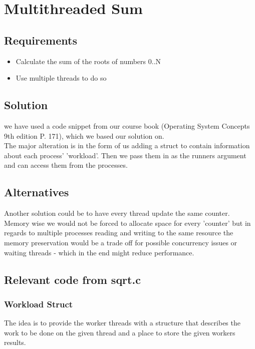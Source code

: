 \chapter{Multithreaded Sum}

\section{Requirements}

\begin{itemize}
\item Calculate the sum of the roots of numbers 0..N
\item Use multiple threads to do so
\end{itemize}

\section{Solution}
we have used a code snippet from our course book (Operating System Concepts 9th edition P. 171), which we based our solution on.\\

The major alteration is in the form of us adding a struct to contain information about each process' 'workload'. Then we pass them in as the runners argument and can access them from the processes.\\

\section{Alternatives}
Another solution could be to have every thread update the same counter. Memory wise we would not be forced to allocate space for every 'counter' but in regards to multiple processes reading and writing to the same resource the memory preservation would be a trade off for possible concurrency issues or waiting threads - which in the end might reduce performance.

\section{Relevant code from sqrt.c}
\subsection{Workload Struct}
The idea is to provide the worker threads with a structure that describes the work to be done on the given thread and a place to store the given workers results.

